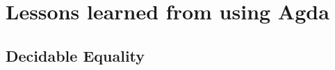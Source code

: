 \chapter{Lessons learned from using Agda}
\label{chap:hindsight}

\section{Decidable Equality}
\label{sec:deceq}
